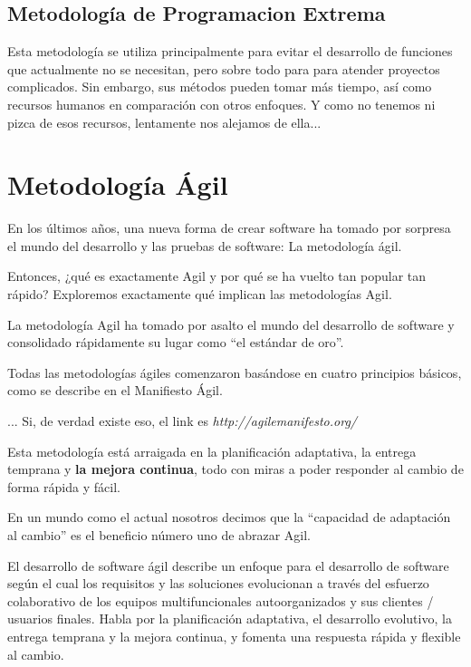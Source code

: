 \documentclass[12pt, fleqn]{report}                             %
\theoremstyle{break}                                            %
\begin{document}
        \subsection{Metodología de Programacion Extrema}
        Esta metodología se utiliza principalmente para evitar el desarrollo de funciones que actualmente no se necesitan, pero sobre todo para  para atender proyectos complicados. Sin embargo, sus métodos pueden tomar más tiempo, así como recursos humanos en comparación con otros enfoques.
        Y como no tenemos ni pizca de esos recursos, lentamente nos alejamos de ella...
        
    
    
    
    
    \clearpage
    \section{Metodología Ágil}
    
    
    	En los últimos años, una nueva forma de crear software ha tomado por sorpresa el mundo
    	del desarrollo y las pruebas de software: La metodología ágil.
    
    	Entonces, ¿qué es exactamente Agil y por qué se ha vuelto tan popular tan rápido?
    	Exploremos exactamente qué implican las metodologías Agil.
    
    	La metodología Agil ha tomado por asalto el mundo del desarrollo de software y consolidado
    	rápidamente su lugar como ``el estándar de oro''.
    
    	Todas las metodologías ágiles comenzaron basándose en cuatro principios básicos, como se
    	describe en el Manifiesto Ágil.
    
    	... Si, de verdad existe eso, el link es \emph{http://agilemanifesto.org/} 
    
    	Esta metodología está arraigada en la planificación adaptativa, la entrega temprana y
    	\textbf{la mejora continua}, todo con miras a poder responder al cambio de forma rápida
    	y fácil.
    
    	En un mundo como el actual nosotros decimos que la ``capacidad de adaptación al cambio''
    	es el beneficio número uno de abrazar Agil.
    
    	El desarrollo de software ágil describe un enfoque para el desarrollo de software según
    	el cual los requisitos y las soluciones evolucionan a través del esfuerzo colaborativo de
    	los equipos multifuncionales autoorganizados y sus clientes / usuarios finales. Habla por
    	la planificación adaptativa, el desarrollo evolutivo, la entrega temprana y la mejora continua,
    	y fomenta una respuesta rápida y flexible al cambio.
    
\end{document}
